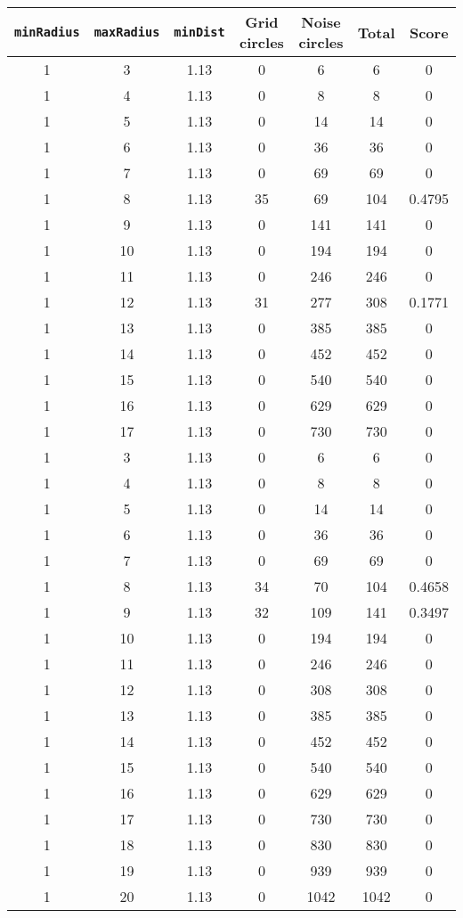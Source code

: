 \documentclass[letterpaper, 12pt]{article}
\begin{document}
\begin{longtable}{|c|c|c|c|c|c|c|}
\hline
\textbf{\texttt{minRadius}} & \textbf{\texttt{maxRadius}} & \textbf{\texttt{minDist}} & \textbf{Grid circles} & \textbf{Noise circles} & \textbf{Total} & \textbf{Score} \\
\hline
1 & 3 & 1.13 & 0 & 6 & 6 & 0 \\
\hline
1 & 4 & 1.13 & 0 & 8 & 8 & 0 \\
\hline
1 & 5 & 1.13 & 0 & 14 & 14 & 0 \\
\hline
1 & 6 & 1.13 & 0 & 36 & 36 & 0 \\
\hline
1 & 7 & 1.13 & 0 & 69 & 69 & 0 \\
\hline
1 & 8 & 1.13 & 35 & 69 & 104 & 0.4795 \\
\hline
1 & 9 & 1.13 & 0 & 141 & 141 & 0 \\
\hline
1 & 10 & 1.13 & 0 & 194 & 194 & 0 \\
\hline
1 & 11 & 1.13 & 0 & 246 & 246 & 0 \\
\hline
1 & 12 & 1.13 & 31 & 277 & 308 & 0.1771 \\
\hline
1 & 13 & 1.13 & 0 & 385 & 385 & 0 \\
\hline
1 & 14 & 1.13 & 0 & 452 & 452 & 0 \\
\hline
1 & 15 & 1.13 & 0 & 540 & 540 & 0 \\
\hline
1 & 16 & 1.13 & 0 & 629 & 629 & 0 \\
\hline
1 & 17 & 1.13 & 0 & 730 & 730 & 0 \\
\hline
1 & 3 & 1.13 & 0 & 6 & 6 & 0 \\
\hline
1 & 4 & 1.13 & 0 & 8 & 8 & 0 \\
\hline
1 & 5 & 1.13 & 0 & 14 & 14 & 0 \\
\hline
1 & 6 & 1.13 & 0 & 36 & 36 & 0 \\
\hline
1 & 7 & 1.13 & 0 & 69 & 69 & 0 \\
\hline
1 & 8 & 1.13 & 34 & 70 & 104 & 0.4658 \\
\hline
1 & 9 & 1.13 & 32 & 109 & 141 & 0.3497 \\
\hline
1 & 10 & 1.13 & 0 & 194 & 194 & 0 \\
\hline
1 & 11 & 1.13 & 0 & 246 & 246 & 0 \\
\hline
1 & 12 & 1.13 & 0 & 308 & 308 & 0 \\
\hline
1 & 13 & 1.13 & 0 & 385 & 385 & 0 \\
\hline
1 & 14 & 1.13 & 0 & 452 & 452 & 0 \\
\hline
1 & 15 & 1.13 & 0 & 540 & 540 & 0 \\
\hline
1 & 16 & 1.13 & 0 & 629 & 629 & 0 \\
\hline
1 & 17 & 1.13 & 0 & 730 & 730 & 0 \\
\hline
1 & 18 & 1.13 & 0 & 830 & 830 & 0 \\
\hline
1 & 19 & 1.13 & 0 & 939 & 939 & 0 \\
\hline
1 & 20 & 1.13 & 0 & 1042 & 1042 & 0 \\
\hline
\end{longtable}
\end{document}
